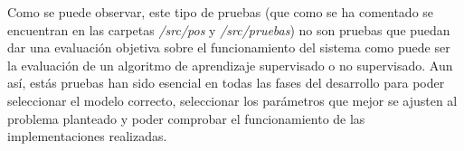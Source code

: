 Como se puede observar, este tipo de pruebas (que como se ha comentado se encuentran en las carpetas \textit{/src/pos} y \textit{/src/pruebas}) no son pruebas que puedan dar una evaluación objetiva sobre el funcionamiento del sistema como puede ser la evaluación de un algoritmo de aprendizaje supervisado o no supervisado. Aun así, estás pruebas han sido esencial en todas las fases del desarrollo para poder seleccionar el modelo correcto, seleccionar los parámetros que mejor se ajusten al problema planteado y poder comprobar el funcionamiento de las implementaciones realizadas.

